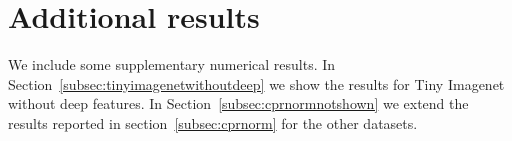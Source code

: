 \documentclass{article} \usepackage{iclr2020_conference,times}
\def\secref#1{section~\ref{#1}}
\def\Secref#1{Section~\ref{#1}}
\begin{document}
\begin{table}[th]
\centering
\caption{Runtime comparison: runtimes (in seconds) are reported for all methods and datasets in \Secref{subsec:res}, where the outlier ratio is $c=0.5$.
Since  GT was only applied to the image datasets without deep features, its runtime is not available (N/A) for the last three datasets.
}
\label{tab:runtime}

\end{table}


\section{Additional results}

We include some supplementary numerical results. In \Secref{subsec:tinyimagenetwithoutdeep} we show the results for Tiny Imagenet without deep features. In \Secref{subsec:cprnormnotshown} we extend the results reported in \secref{subsec:cprnorm} for the other datasets.
\end{document}
